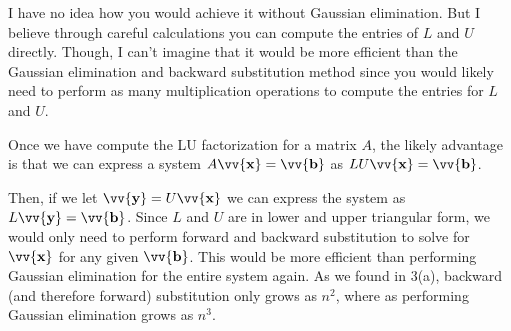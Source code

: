 \documentclass[12pt]{article}
\newcommand{\vect}[1]{\vv{\mathbf{#1}}}
\begin{document}
I have no idea how you would achieve it without Gaussian elimination. But I believe through careful calculations you can compute the entries of $L$ and $U$ directly. Though, I can't imagine that it would be more efficient than the Gaussian elimination and backward substitution method since you would likely need to perform as many multiplication operations to compute the entries for $L$ and $U$.

Once we have compute the LU factorization for a matrix $A$, the likely advantage is that we can express a system $A\vect{x}=\vect{b}$ as $LU\vect{x}=\vect{b}$.

Then, if we let $\vect{y}=U\vect{x}$ we can express the system as $L\vect{y}=\vect{b}$. Since $L$ and $U$ are in lower and upper triangular form, we would only need to perform forward and backward substitution to solve for $\vect{x}$ for any given $\vect{b}$. This would be more efficient than performing Gaussian elimination for the entire system again. As we found in 3(a), backward (and therefore forward) substitution only grows as $n^2$, where as performing Gaussian elimination grows as $n^3$. 
\end{document}

